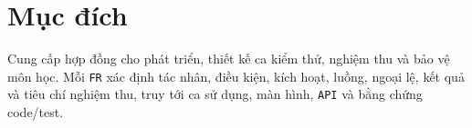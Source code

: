 \clearpage
\section{Mục đích}\label{sec:srs-2}
Cung cấp hợp đồng cho phát triển, thiết kế ca kiểm thử, nghiệm thu và bảo vệ môn học. Mỗi \texttt{FR} xác định tác nhân, điều kiện, kích hoạt, luồng, ngoại lệ, kết quả và tiêu chí nghiệm thu, truy tới ca sử dụng, màn hình, \texttt{API} và bằng chứng code/\allowbreak{}test.
